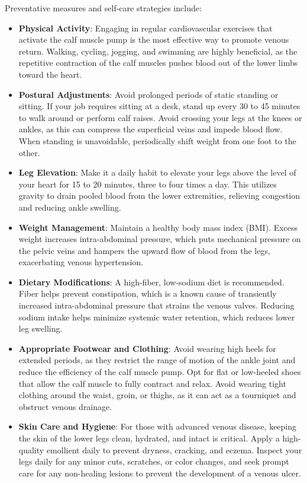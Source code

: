 Preventative measures and self-care strategies include:
\begin{itemize}
\item \textbf{Physical Activity}: Engaging in regular cardiovascular exercises that activate the calf muscle pump is the most effective way to promote venous return. Walking, cycling, jogging, and swimming are highly beneficial, as the repetitive contraction of the calf muscles pushes blood out of the lower limbs toward the heart.
\item \textbf{Postural Adjustments}: Avoid prolonged periods of static standing or sitting. If your job requires sitting at a desk, stand up every 30 to 45 minutes to walk around or perform calf raises. Avoid crossing your legs at the knees or ankles, as this can compress the superficial veins and impede blood flow. When standing is unavoidable, periodically shift weight from one foot to the other.
\item \textbf{Leg Elevation}: Make it a daily habit to elevate your legs above the level of your heart for 15 to 20 minutes, three to four times a day. This utilizes gravity to drain pooled blood from the lower extremities, relieving congestion and reducing ankle swelling.
\item \textbf{Weight Management}: Maintain a healthy body mass index (BMI). Excess weight increases intra-abdominal pressure, which puts mechanical pressure on the pelvic veins and hampers the upward flow of blood from the legs, exacerbating venous hypertension.
\item \textbf{Dietary Modifications}: A high-fiber, low-sodium diet is recommended. Fiber helps prevent constipation, which is a known cause of transiently increased intra-abdominal pressure that strains the venous valves. Reducing sodium intake helps minimize systemic water retention, which reduces lower leg swelling.
\item \textbf{Appropriate Footwear and Clothing}: Avoid wearing high heels for extended periods, as they restrict the range of motion of the ankle joint and reduce the efficiency of the calf muscle pump. Opt for flat or low-heeled shoes that allow the calf muscle to fully contract and relax. Avoid wearing tight clothing around the waist, groin, or thighs, as it can act as a tourniquet and obstruct venous drainage.
\item \textbf{Skin Care and Hygiene}: For those with advanced venous disease, keeping the skin of the lower legs clean, hydrated, and intact is critical. Apply a high-quality emollient daily to prevent dryness, cracking, and eczema. Inspect your legs daily for any minor cuts, scratches, or color changes, and seek prompt care for any non-healing lesions to prevent the development of a venous ulcer.
\end{itemize}

